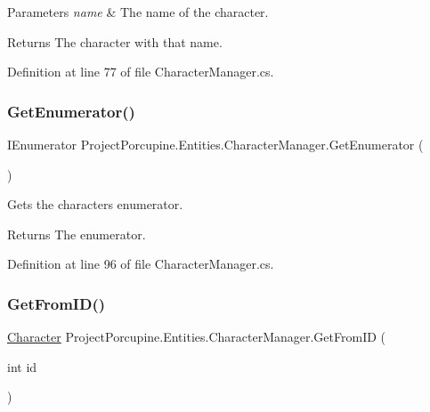 \begin{DoxyParams}{Parameters}
{\em name} & The name of the character.\\
\hline
\end{DoxyParams}
\begin{DoxyReturn}{Returns}
The character with that name.
\end{DoxyReturn}


Definition at line 77 of file Character\+Manager.\+cs.

\mbox{\label{class_project_porcupine_1_1_entities_1_1_character_manager_a2d75bb0449e9a7e74e43a1a9f4c91b10}} 
\subsubsection{\texorpdfstring{Get\+Enumerator()}{GetEnumerator()}}
{\footnotesize\ttfamily I\+Enumerator Project\+Porcupine.\+Entities.\+Character\+Manager.\+Get\+Enumerator (\begin{DoxyParamCaption}{ }\end{DoxyParamCaption})}



Gets the characters enumerator. 

\begin{DoxyReturn}{Returns}
The enumerator.
\end{DoxyReturn}


Definition at line 96 of file Character\+Manager.\+cs.

\mbox{\label{class_project_porcupine_1_1_entities_1_1_character_manager_a78609b299737390c470ae939a9a00bd9}} 
\subsubsection{\texorpdfstring{Get\+From\+I\+D()}{GetFromID()}}
{\footnotesize\ttfamily \hyperlink{class_project_porcupine_1_1_entities_1_1_character}{Character} Project\+Porcupine.\+Entities.\+Character\+Manager.\+Get\+From\+ID (\begin{DoxyParamCaption}\item[{int}]{id }\end{DoxyParamCaption})}



